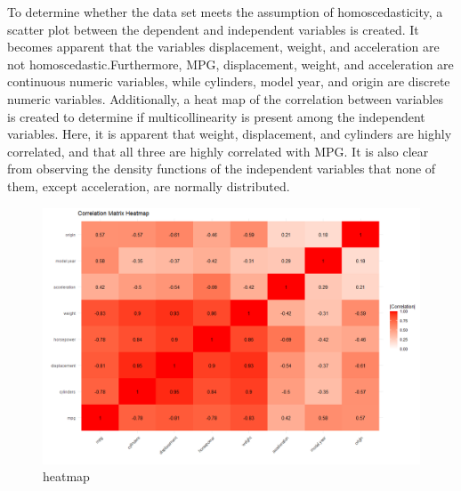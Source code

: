 


\lstset{style=mystyle}
	
	To determine whether the data set meets the assumption of homoscedasticity, a scatter plot between the dependent and independent variables is created. It becomes apparent that the variables displacement, weight, and acceleration are not homoscedastic.Furthermore, MPG, displacement, weight, and acceleration are continuous numeric variables, while cylinders, model year, and origin are discrete numeric variables. Additionally, a heat map of the correlation between variables is created to determine if multicollinearity is present among the independent variables. Here, it is apparent that weight, displacement, and cylinders are highly correlated, and that all three are highly correlated with MPG. It is also clear from observing the density functions of the independent variables that none of them, except acceleration, are normally distributed. 
	



\begin{figure}[h] 
	\centering\includegraphics[width=14cm]{billder/1.png}
	\caption{heatmap}
	\label{fig:intro1}
\end{figure}


